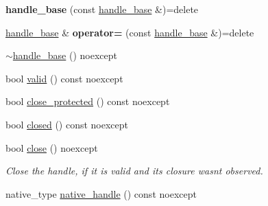 \begin{DoxyCompactItemize}
{\bfseries handle\+\_\+base} (const \mbox{\hyperlink{classdistant_1_1detail_1_1handle__base}{handle\+\_\+base}} \&)=delete
\item 
\mbox{\label{classdistant_1_1detail_1_1handle__base_ac1e69f9ae94a849c04a4d25a684bb6f2}} 
\mbox{\hyperlink{classdistant_1_1detail_1_1handle__base}{handle\+\_\+base}} \& {\bfseries operator=} (const \mbox{\hyperlink{classdistant_1_1detail_1_1handle__base}{handle\+\_\+base}} \&)=delete
\item 
\mbox{\hyperlink{classdistant_1_1detail_1_1handle__base_aca25c1c62b12456c616ff3e010c61a8d}{$\sim$handle\+\_\+base}} () noexcept
\item 
bool \mbox{\hyperlink{classdistant_1_1detail_1_1handle__base_aa138b2e6e919a0199225403558e1b63d}{valid}} () const noexcept
\item 
bool \mbox{\hyperlink{classdistant_1_1detail_1_1handle__base_a6474b8752ffa2a3f3c75586be2fcf6b9}{close\+\_\+protected}} () const noexcept
\item 
bool \mbox{\hyperlink{classdistant_1_1detail_1_1handle__base_abd5ad44b32fda79418c5faada682336a}{closed}} () const noexcept
\item 
\mbox{\label{classdistant_1_1detail_1_1handle__base_a761be454d0d8de053378d561abfb5afd}} 
bool \mbox{\hyperlink{classdistant_1_1detail_1_1handle__base_a761be454d0d8de053378d561abfb5afd}{close}} () noexcept
\begin{DoxyCompactList}\small\item\em Close the handle, if it is valid and its closure wasn\textquotesingle{}t observed. \end{DoxyCompactList}\item 
native\+\_\+type \mbox{\hyperlink{classdistant_1_1detail_1_1handle__base_a3207e125c17f2ebb59cab614083f782b}{native\+\_\+handle}} () const noexcept
\end{DoxyCompactItemize}
